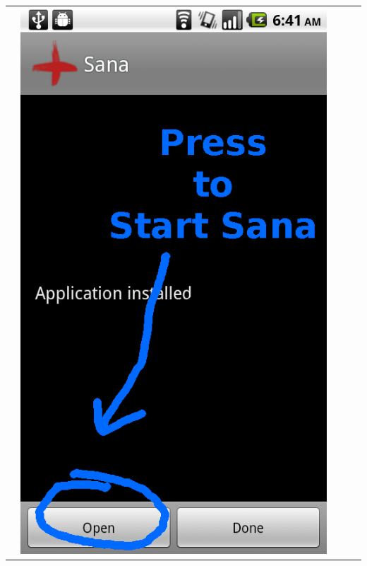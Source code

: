 \documentclass[a4paper,10pt]{article}
\begin{document}
\begin{flushleft}
\begin{tabular}{ c c c c c }
&\includegraphics[scale=0.15,keepaspectratio=true]{install_complete.png}

\end{tabular}
\end{flushleft}
\end{document}
